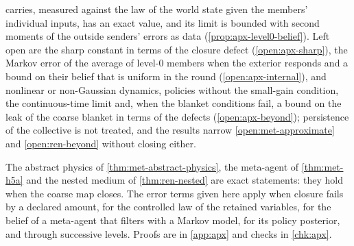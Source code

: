 carries, measured against the law of the world state given the members' individual inputs, has an exact value, and its limit is bounded with second moments of the outside senders' errors as data (\cref{prop:apx-level0-belief}). Left open are the sharp constant in terms of the closure defect (\cref{open:apx-sharp}), the Markov error of the average of level-0 members when the exterior responds and a bound on their belief that is uniform in the round (\cref{open:apx-internal}), and nonlinear or non-Gaussian dynamics, policies without the small-gain condition, the continuous-time limit and, when the blanket conditions fail, a bound on the leak of the coarse blanket in terms of the defects (\cref{open:apx-beyond}); persistence of the collective is not treated, and the results narrow \cref{open:met-approximate} and \cref{open:ren-beyond} without closing either.

The abstract physics of \cref{thm:met-abstract-physics}, the meta-agent of \cref{thm:met-h5a} and the nested medium of \cref{thm:ren-nested} are exact statements: they hold when the coarse map closes. The error terms given here apply when closure fails by a declared amount, for the controlled law of the retained variables, for the belief of a meta-agent that filters with a Markov model, for its policy posterior, and through successive levels. Proofs are in \cref{app:apx} and checks in \cref{chk:apx}.

